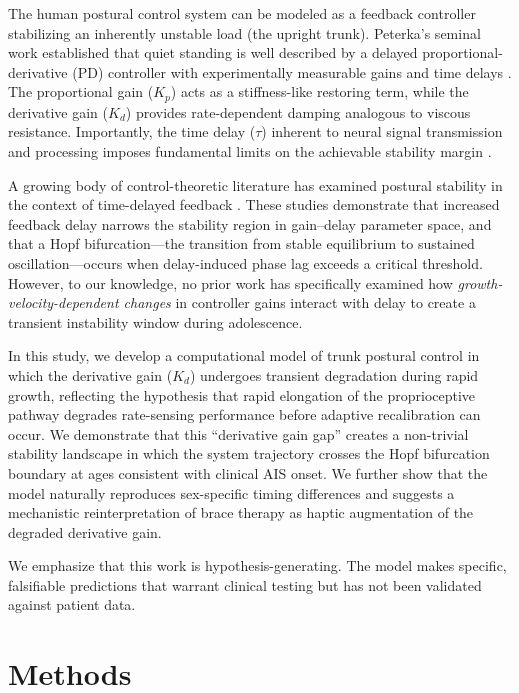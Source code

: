 \documentclass[12pt,a4paper]{article}
\begin{document}
The human postural control system can be modeled as a feedback controller stabilizing an inherently unstable load (the upright trunk). Peterka's seminal work established that quiet standing is well described by a delayed proportional-derivative (PD) controller with experimentally measurable gains and time delays \citep{peterka2002sensorimotor}. The proportional gain ($K_p$) acts as a stiffness-like restoring term, while the derivative gain ($K_d$) provides rate-dependent damping analogous to viscous resistance. Importantly, the time delay ($\tau$) inherent to neural signal transmission and processing imposes fundamental limits on the achievable stability margin \citep{stepan2009delay, insperger2011semi}.

A growing body of control-theoretic literature has examined postural stability in the context of time-delayed feedback \citep{milton2009delay, cabrera2004human, asai2009model}. These studies demonstrate that increased feedback delay narrows the stability region in gain--delay parameter space, and that a Hopf bifurcation---the transition from stable equilibrium to sustained oscillation---occurs when delay-induced phase lag exceeds a critical threshold. However, to our knowledge, no prior work has specifically examined how \textit{growth-velocity-dependent changes} in controller gains interact with delay to create a transient instability window during adolescence.

In this study, we develop a computational model of trunk postural control in which the derivative gain ($K_d$) undergoes transient degradation during rapid growth, reflecting the hypothesis that rapid elongation of the proprioceptive pathway degrades rate-sensing performance before adaptive recalibration can occur. We demonstrate that this ``derivative gain gap'' creates a non-trivial stability landscape in which the system trajectory crosses the Hopf bifurcation boundary at ages consistent with clinical AIS onset. We further show that the model naturally reproduces sex-specific timing differences and suggests a mechanistic reinterpretation of brace therapy as haptic augmentation of the degraded derivative gain.

We emphasize that this work is hypothesis-generating. The model makes specific, falsifiable predictions that warrant clinical testing but has not been validated against patient data.

\section{Methods}
\end{document}
